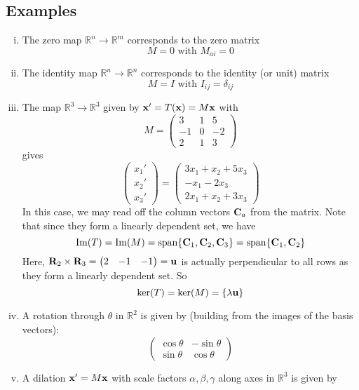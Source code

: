 \documentclass{article}
\begin{document}
\subsection{Examples}
\begin{enumerate}[(i)]
	\item The zero map $\mathbb R^n \to \mathbb R^m$ corresponds to the zero matrix
	      \[ M = 0 \text{ with } M_{ai} = 0 \]
	\item The identity map $\mathbb R^n \to \mathbb R^n$ corresponds to the identity (or unit) matrix
	      \[ M = I \text{ with } I_{ij} = \delta_{ij} \]
	\item The map $\mathbb R^3 \to \mathbb R^3$ given by $\vb x' = T(\vb x) = M\vb x$ with
	      \[ M = \begin{pmatrix}
			      3  & 1 & 5  \\
			      -1 & 0 & -2 \\
			      2  & 1 & 3
		      \end{pmatrix} \]
	      gives
	      \[
		      \begin{pmatrix}
			      x_1' \\ x_2' \\ x_3'
		      \end{pmatrix}
		      =
		      \begin{pmatrix}
			      3x_1 + x_2 + 5x_3 \\
			      -x_1 - 2x_3       \\
			      2x_1 + x_2 + 3x_3
		      \end{pmatrix}
	      \]
	      In this case, we may read off the column vectors $\vb C_a$ from the matrix. Note that since they form a linearly dependent set, we have
	      \[ \Im(T) = \Im(M) = \operatorname{span} \{ \vb C_1, \vb C_2, \vb C_3 \} = \operatorname{span} \{ \vb C_1, \vb C_2 \} \]
	      Here, $\vb R_2 \times \vb R_3 = \begin{pmatrix}
			      2 & -1 & -1
		      \end{pmatrix} = \vb u$ is actually perpendicular to all rows as they form a linearly dependent set. So
	      \[ \ker(T) = \ker(M) = \{ \lambda \vb u \} \]
	\item A rotation through $\theta$ in $\mathbb R^2$ is given by (building from the images of the basis vectors):
	      \[ \begin{pmatrix}
			      \cos \theta & -\sin \theta \\
			      \sin \theta & \cos \theta
		      \end{pmatrix} \]
	\item A dilation $\vb x' = M \vb x$ with scale factors $\alpha, \beta, \gamma$ along axes in $\mathbb R^3$ is given by

\end{enumerate}
\end{document}
